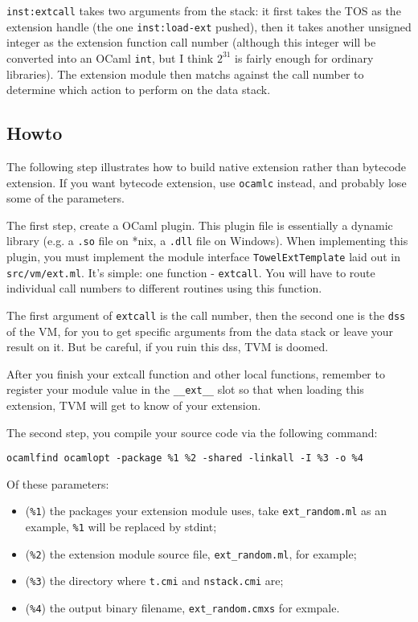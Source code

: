 \documentclass{article}
\newcommand{\inst}[1] {\texttt{inst:#1}}
\begin{document}
\inst{extcall} takes two arguments from the stack: it first takes the TOS as the extension handle (the one \inst{load-ext} pushed), then it takes another unsigned integer as the extension function call number (although this integer will be converted into an OCaml \texttt{int}, but I think $2^{31}$ is fairly enough for ordinary libraries). The extension module then matchs against the call number to determine which action to perform on the data stack.

\subsection{Howto}

The following step illustrates how to build native extension rather than bytecode extension. If you want bytecode extension, use \texttt{ocamlc} instead, and probably lose some of the parameters.

The first step, create a OCaml plugin. This plugin file is essentially a dynamic library (e.g. a \texttt{.so} file on *nix, a \texttt{.dll} file on Windows). When implementing this plugin, you must implement the module interface \texttt{TowelExtTemplate} laid out in \texttt{src/vm/ext.ml}. It's simple: one function - \texttt{extcall}. You will have to route individual call numbers to different routines using this function.

The first argument of \texttt{extcall} is the call number, then the second one is the \texttt{dss} of the VM, for you to get specific arguments from the data stack or leave your result on it. But be careful, if you ruin this dss, TVM is doomed.

After you finish your extcall function and other local functions, remember to register your module value in the \texttt{\_\_ext\_\_} slot so that when loading this extension, TVM will get to know of your extension.

The second step, you compile your source code via the following command:\newline

\texttt{ocamlfind ocamlopt -package \%1 \%2 -shared -linkall -I \%3 -o \%4}
\newline

Of these parameters:
\begin{itemize}
\item (\texttt{\%1}) the packages your extension module uses, take \texttt{ext\_random.ml} as an example, \texttt{\%1} will be replaced by stdint;
\item (\texttt{\%2}) the extension module source file, \texttt{ext\_random.ml}, for example;
\item (\texttt{\%3}) the directory where \texttt{t.cmi} and \texttt{nstack.cmi} are;
\item (\texttt{\%4}) the output binary filename, \texttt{ext\_random.cmxs} for exmpale.
\end{itemize}
\end{document}
